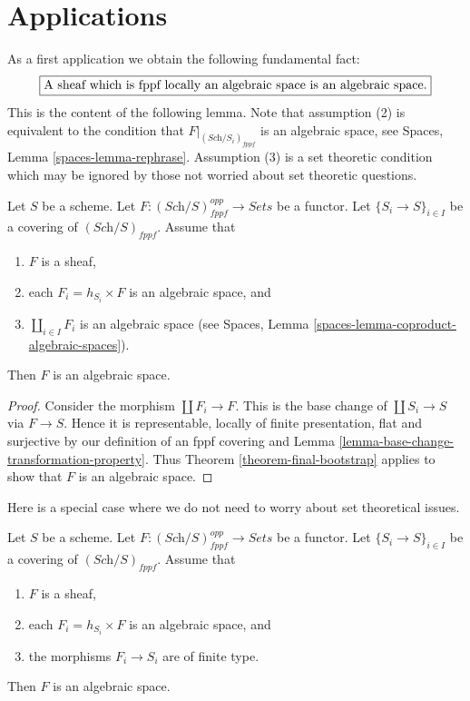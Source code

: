 \section{Applications}
\label{section-applications}

\noindent
As a first application we obtain the following fundamental fact:
$$
\fbox{A sheaf which is fppf locally an algebraic space is an algebraic space.}
$$
This is the content of the following lemma.
Note that assumption (2) is equivalent to the condition that
$F|_{(\textit{Sch}/S_i)_{fppf}}$ is an algebraic space, see
Spaces, Lemma \ref{spaces-lemma-rephrase}.
Assumption (3) is a set theoretic condition which may be ignored
by those not worried about set theoretic questions.

\begin{lemma}
\label{lemma-locally-algebraic-space}
Let $S$ be a scheme.
Let $F : (\textit{Sch}/S)_{fppf}^{opp} \to \textit{Sets}$ be a functor.
Let $\{S_i \to S\}_{i \in I}$ be a covering of $(\textit{Sch}/S)_{fppf}$.
Assume that
\begin{enumerate}
\item $F$ is a sheaf,
\item each $F_i = h_{S_i} \times F$ is an algebraic space, and
\item $\coprod_{i \in I} F_i$ is an algebraic space (see
Spaces, Lemma \ref{spaces-lemma-coproduct-algebraic-spaces}).
\end{enumerate}
Then $F$ is an algebraic space.
\end{lemma}

\begin{proof}
Consider the morphism $\coprod F_i \to F$. This is the base change
of $\coprod S_i \to S$ via $F \to S$. Hence it is representable,
locally of finite presentation, flat and surjective by our definition
of an fppf covering and
Lemma \ref{lemma-base-change-transformation-property}.
Thus
Theorem \ref{theorem-final-bootstrap}
applies to show that $F$ is an algebraic space.
\end{proof}

\noindent
Here is a special case where we do not need to worry about set theoretical
issues.

\begin{lemma}
\label{lemma-locally-algebraic-space-finite-type}
Let $S$ be a scheme.
Let $F : (\textit{Sch}/S)_{fppf}^{opp} \to \textit{Sets}$ be a functor.
Let $\{S_i \to S\}_{i \in I}$ be a covering of $(\textit{Sch}/S)_{fppf}$.
Assume that
\begin{enumerate}
\item $F$ is a sheaf,
\item each $F_i = h_{S_i} \times F$ is an algebraic space, and
\item the morphisms $F_i \to S_i$ are of finite type.
\end{enumerate}
Then $F$ is an algebraic space.
\end{lemma}

